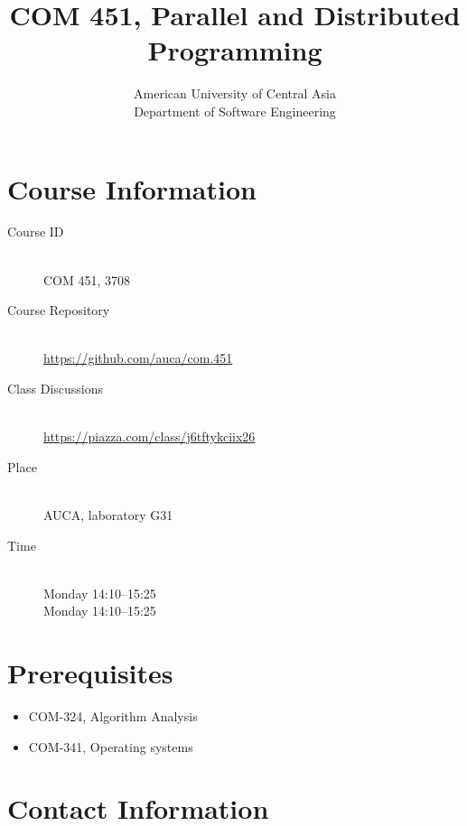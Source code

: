 \documentclass[12pt,a4paper,oneside]{article}
\begin{document}
    \title{COM 451, Parallel and Distributed Programming}
    \author{
        American University of Central Asia\\
        Department of Software Engineering
    }
    \date{}
    \maketitle

    \section{Course Information}

        \begin{description}
            \item[Course ID]\hfill\\
                COM 451, 3708
            \item[Course Repository]\hfill\\
                \url{https://github.com/auca/com.451}
            \item[Class Discussions]\hfill\\
                \url{https://piazza.com/class/j6tftykciix26}
            \item[Place]\hfill\\
                AUCA, laboratory G31
            \item[Time]\hfill\\
                Monday 14:10--15:25\\
                Monday 14:10--15:25
        \end{description}

    \section{Prerequisites}

        \begin{itemize}
            \item COM-324, Algorithm Analysis
            \item COM-341, Operating systems
        \end{itemize}

    \section{Contact Information}
\end{document}
